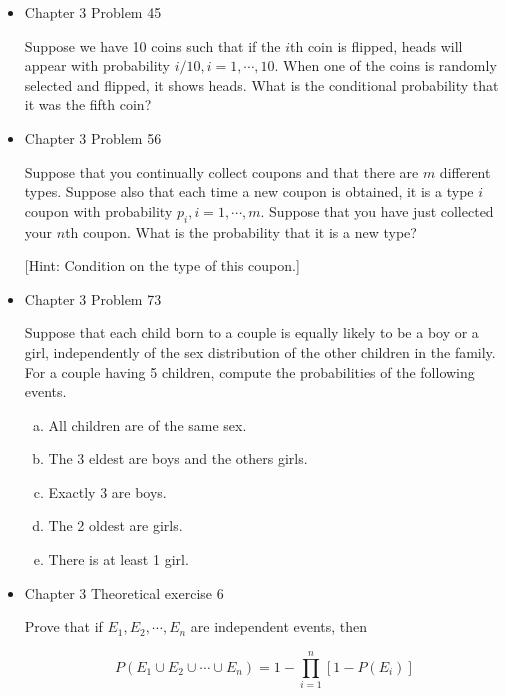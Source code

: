 \documentclass[11pt]{article}
\begin{document}
\begin{itemize}
    \item
    Chapter 3 Problem  45
    
    Suppose we have 10 coins such that if the $i$th coin is flipped, heads will appear with probability $i/10, i = 1, \cdots, 10$. When one of the coins is randomly selected and flipped, it shows heads. What is the conditional probability that it was the fifth coin?

    \item
    Chapter 3 Problem  56
    
    Suppose that you continually collect coupons and that there are $m$ different types. Suppose also that each time a new coupon is obtained, it is a type $i$ coupon with probability $p_i, i = 1, \cdots, m$. Suppose that you have just collected your $n$th coupon. What is the probability that it is a new type?
    
    [Hint: Condition on the type of this coupon.]

    \item
    Chapter 3 Problem  73
    
    Suppose that each child born to a couple is equally likely to be a boy or a girl, independently of the sex distribution of the other children in the family. For a couple having 5 children, compute the probabilities of the following events.
    
    \begin{enumerate}[(a)]
    \item All children are of the same sex.
    
    \item The 3 eldest are boys and the others girls.
    
    \item Exactly 3 are boys.
    
    \item The 2 oldest are girls.
    
    \item There is at least 1 girl.
    \end{enumerate}


    \item
    Chapter 3 Theoretical exercise 6
    
    Prove that if $E_1, E_2, \cdots, E_n$ are independent events, then
    
    $$
    P(E_1 \cup E_2 \cup \cdots \cup E_n)  = 1 - \prod_{i=1}^{n}[1 - P(E_i)]
    $$



\end{itemize}
\end{document}
